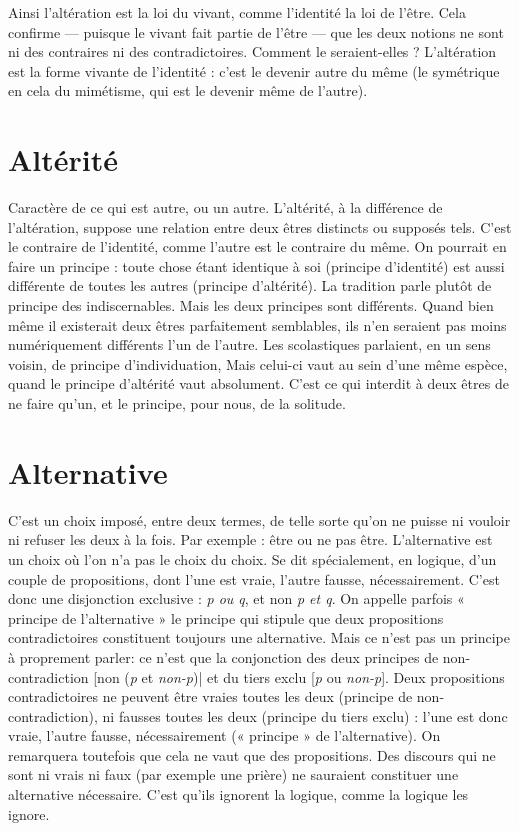 Ainsi l’altération est la loi du vivant, comme l'identité la loi de l’être. Cela
confirme — puisque le vivant fait partie de l'être — que les deux notions ne sont
ni des contraires ni des contradictoires. Comment le seraient-elles ? L’altération
est la forme vivante de l’identité : c’est le devenir autre du même (le symétrique
en cela du mimétisme, qui est le devenir même de l’autre).

\section{Altérité}
Caractère de ce qui est autre, ou un autre. L’altérité, à la différence
de l’altération, suppose une relation entre deux êtres distincts
ou supposés tels. C’est le contraire de l'identité, comme l’autre est le
contraire du même. On pourrait en faire un principe : toute chose étant identique
à soi (principe d'identité) est aussi différente de toutes les autres (principe
d’altérité). La tradition parle plutôt de principe des indiscernables. Mais les
deux principes sont différents. Quand bien même il existerait deux êtres parfaitement
semblables, ils n’en seraient pas moins numériquement différents l’un
de l’autre. Les scolastiques parlaient, en un sens voisin, de principe d’individuation,
Mais celui-ci vaut au sein d’une même espèce, quand le principe d’altérité
vaut absolument. C’est ce qui interdit à deux êtres de ne faire qu’un, et le principe,
pour nous, de la solitude.

\section{Alternative}
C'est un choix imposé, entre deux termes, de telle sorte qu’on
ne puisse ni vouloir ni refuser les deux à la fois. Par exemple :
être ou ne pas être. L’alternative est un choix où l’on n’a pas le choix du choix.
Se dit spécialement, en logique, d’un couple de propositions, dont l’une est
vraie, l’autre fausse, nécessairement. C’est donc une disjonction exclusive : {\it p ou
q}, et non {\it p et q}. On appelle parfois « principe de l'alternative » le principe qui
stipule que deux propositions contradictoires constituent toujours une alternative.
Mais ce n’est pas un principe à proprement parler: ce n'est que la
conjonction des deux principes de non-contradiction [non ({\it p} et {\it non-p})| et du
tiers exclu [{\it p} ou {\it non-p}]. Deux propositions contradictoires ne peuvent être
vraies toutes les deux (principe de non-contradiction), ni fausses toutes les deux
(principe du tiers exclu) : l’une est donc vraie, l’autre fausse, nécessairement
(« principe » de l'alternative). On remarquera toutefois que cela ne vaut que des
propositions. Des discours qui ne sont ni vrais ni faux (par exemple une prière)
ne sauraient constituer une alternative nécessaire. C’est qu’ils ignorent la
logique, comme la logique les ignore.

